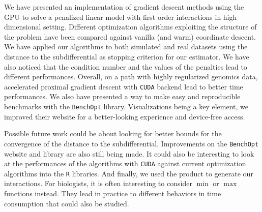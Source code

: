 \documentclass[../main.tex]{subfiles}
\begin{document}
We have presented an implementation of gradient descent methods using the GPU
to solve a penalized linear model with first order interactions in high dimensional setting.
Different optimization algorithms exploiting the structure of the problem have been compared
against vanilla (and warm) coordinate descent.
We have applied our algorithms to both simulated and real datasets
using the distance to the subdifferential as stopping criterion
for our estimator.
We have also noticed that the condition number and the values of the penalties lead to
different performances.
Overall, on a path with highly regularized genomics data, accelerated proximal
gradient descent with \texttt{CUDA} backend lead to better time performances.
We also have presented a way to make easy and reproducible benchmarks with the
\texttt{BenchOpt} library.
Visualizations being a key element, we improved their website for a better-looking
experience and device-free access.

\medskip

Possible future work could be about looking for better bounds for the convergence
of the distance to the subdifferential.
Improvements on the \texttt{BenchOpt} website and library are also still being
made.
It could also be interesting to look at the performances of the algorithms
with \texttt{CUDA} against current optimization algorithms
into the \texttt{R} libraries.
And finally, we used the product to generate our interactions.
For biologists, it is often interesting to consider $\min$ or $\max$ functions
instead.
They lead in practice to different behaviors in time consumption that could
also be studied.
\end{document}
